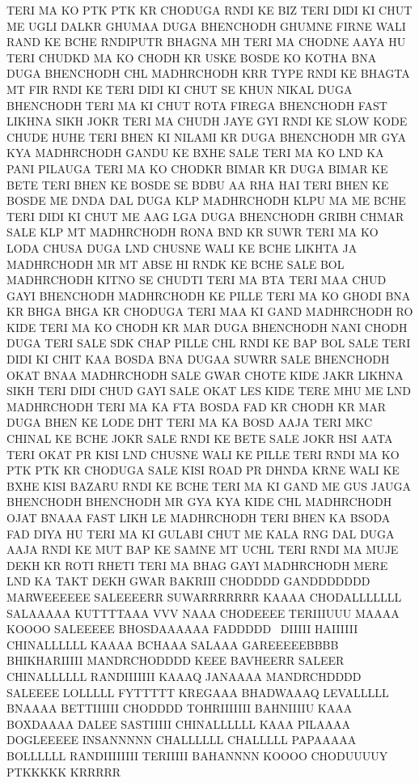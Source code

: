 TERI MA KO PTK PTK KR CHODUGA RNDI KE BIZ
TERI DIDI KI CHUT ME UGLI DALKR GHUMAA DUGA BHENCHODH GHUMNE FIRNE WALI RAND KE BCHE
RNDIPUTR BHAGNA MH TERI MA CHODNE AAYA HU
TERI CHUDKD MA KO CHODH KR USKE BOSDE KO KOTHA BNA DUGA BHENCHODH
CHL MADHRCHODH KRR TYPE RNDI KE BHAGTA MT FIR RNDI KE
TERI DIDI KI CHUT SE KHUN NIKAL DUGA BHENCHODH
TERI MA KI CHUT ROTA FIREGA BHENCHODH
FAST LIKHNA SIKH JOKR TERI MA CHUDH JAYE GYI RNDI KE SLOW KODE CHUDE HUHE
TERI BHEN KI NILAMI KR DUGA
BHENCHODH MR GYA KYA MADHRCHODH GANDU KE BXHE SALE
TERI MA KO LND KA PANI PILAUGA
TERI MA KO CHODKR BIMAR KR DUGA BIMAR KE BETE
TERI BHEN KE BOSDE SE BDBU AA RHA HAI
TERI BHEN KE BOSDE ME DNDA DAL DUGA KLP MADHRCHODH KLPU MA ME BCHE
TERI DIDI KI CHUT ME AAG LGA DUGA BHENCHODH GRIBH CHMAR SALE
KLP MT MADHRCHODH RONA BND KR SUWR 
TERI MA KO LODA CHUSA DUGA LND CHUSNE WALI KE BCHE
LIKHTA JA MADHRCHODH MR MT ABSE HI RNDK KE BCHE SALE
BOL MADHRCHODH KITNO SE CHUDTI TERI MA BTA 
TERI MAA CHUD GAYI BHENCHODH MADHRCHODH KE PILLE
TERI MA KO GHODI BNA KR BHGA BHGA KR CHODUGA 
TERI MAA KI GAND MADHRCHODH RO KIDE
TERI MA KO CHODH KR MAR DUGA BHENCHODH
NANI CHODH DUGA TERI SALE SDK CHAP PILLE
CHL RNDI KE BAP BOL SALE
TERI DIDI KI CHIT KAA BOSDA BNA DUGAA SUWRR SALE
BHENCHODH OKAT BNAA MADHRCHODH
SALE GWAR CHOTE KIDE JAKR LIKHNA SIKH
TERI DIDI CHUD GAYI SALE OKAT LES KIDE
TERE MHU ME LND MADHRCHODH 
TERI MA KA FTA BOSDA FAD KR CHODH KR MAR DUGA BHEN KE LODE
DHT TERI MA KA BOSD AAJA
TERI MKC CHINAL KE BCHE JOKR SALE
RNDI KE BETE SALE JOKR HSI AATA TERI OKAT PR
KISI LND CHUSNE WALI KE PILLE 
TERI RNDI MA KO PTK PTK KR CHODUGA
SALE KISI ROAD PR DHNDA KRNE WALI KE BXHE
KISI BAZARU RNDI KE BCHE
TERI MA KI GAND ME GUS JAUGA BHENCHODH
BHENCHODH MR GYA KYA KIDE
CHL MADHRCHODH OJAT BNAAA FAST LIKH
LE MADHRCHODH TERI BHEN KA BSODA FAD DIYA HU
TERI MA KI GULABI CHUT ME KALA RNG DAL DUGA
AAJA RNDI KE MUT BAP KE SAMNE MT UCHL
TERI RNDI MA MUJE DEKH KR ROTI RHETI
TERI MA BHAG GAYI MADHRCHODH MERE LND KA TAKT DEKH GWAR
BAKRIII CHODDDD GANDDDDDDD MARWEEEEEE SALEEEERR
SUWARRRRRRR KAAAA CHODALLLLLLL SALAAAAA
KUTTTTAAA VVV NAAA CHODEEEE 
TERIIIUUU MAAAA KOOOO SALEEEEE 
BHOSDAAAAAA FADDDDD  DIIIII HAIIIIII
CHINALLLLLL KAAAA BCHAAA SALAAA 
GAREEEEEBBBB BHIKHARIIIII 
MANDRCHODDDD KEEE BAVHEERR SALEER CHINALLLLLL
RANDIIIIIII KAAAQ JANAAAA 
MANDRCHDDDD SALEEEE LOLLLLL 
FYTTTTT KREGAAA BHADWAAAQ LEVALLLLL BNAAAA BETTIIIIII CHODDDD
TOHRIIIIIII BAHNIIIIU KAAA BOXDAAAA 
DALEE SASTIIIII CHINALLLLLL KAAA PILAAAA 
DOGLEEEEE INSANNNNN
CHALLLLLL CHALLLLL PAPAAAAA BOLLLLLL 
RANDIIIIIIII TERIIIII BAHANNNN KOOOO CHODUUUUY PTKKKKK KRRRRR
